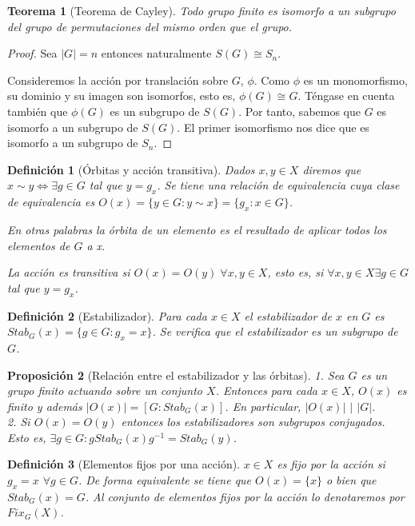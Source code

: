 \documentclass{article}
\theoremstyle{theorem-style}  %
\newtheorem{theorem}{Teorema}[section]  %
\newtheorem{proposition}[theorem]{Proposición}
\theoremstyle{definition-style}
\newtheorem{definition}{Definición}[section]
\theoremstyle{example-style}
\begin{document}
\begin{theorem}[Teorema de Cayley]
Todo grupo finito es isomorfo a un subgrupo del grupo de permutaciones del mismo orden que el grupo.
\end{theorem}
\begin{proof}
Sea $|G|=n$ entonces naturalmente $S(G) \cong S_n$. 

Consideremos la acción por translación sobre $G$, $\phi$. Como $\phi$ es un monomorfismo, su dominio y su imagen son isomorfos, esto es, $\phi(G) \cong G$. Téngase en cuenta también que $\phi(G)$ es un subgrupo de $S(G)$. Por tanto, sabemos que $G$ es isomorfo a un subgrupo de $S(G)$. El primer isomorfismo nos dice que es isomorfo a un subgrupo de $S_n$.
\end{proof}

\begin{definition}[Órbitas y acción transitiva]
Dados $x,y \in X$ diremos que $x \sim y \iff \exists g \in G$ tal que $y = g_x$. Se tiene una relación de equivalencia cuya clase de equivalencia es $O(x) = \{y \in G:y \sim x\} = \{g_x:x \in G\}$.

En otras palabras la órbita de un elemento es el resultado de aplicar todos los elementos de $G$ a x. 

La acción es transitiva si $O(x) = O(y) \; \forall x,y \in X$, esto es, si $\forall x,y \in X \exists g \in G$ tal que $y = g_x$.
\end{definition}

\begin{definition}[Estabilizador]
Para cada $x \in X$ el estabilizador de $x$ en $G$ es $Stab_G(x) = \{g \in G:g_x = x\}$. Se verifica que el estabilizador es un subgrupo de $G$.
\end{definition}

\begin{proposition}[Relación entre el estabilizador y las órbitas]
1. Sea $G$ es un grupo finito actuando sobre un conjunto $X$. Entonces para cada $x \in X$, $O(x)$ es finito y además $|O(x)| = [G:Stab_G(x)]$. En particular, $|O(x)|$ $|$ $|G|$.\\
2. Si $O(x) = O(y)$ entonces los estabilizadores son subgrupos conjugados. Esto es, $\exists g \in G:g Stab_G(x) g^{-1} = Stab_G(y)$.
\end{proposition}

\begin{definition}[Elementos fijos por una acción]
$x \in X$ es fijo por la acción si $g_x = x$ $\forall g \in G$. De forma equivalente se tiene que $O(x) = \{x\}$ o bien que $Stab_G(x) = G$. Al conjunto de elementos fijos por la acción lo denotaremos por $Fix_G(X)$.
\end{definition}
\end{document}
